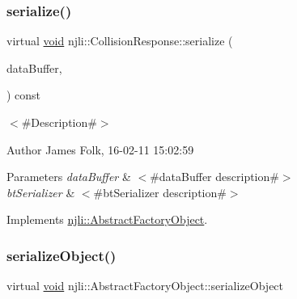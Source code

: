 \mbox{\label{classnjli_1_1_collision_response_ac77762d08227ce57050050a42fa441c3}} 
\subsubsection{\texorpdfstring{serialize()}{serialize()}}
{\footnotesize\ttfamily virtual \mbox{\hyperlink{_thread_8h_af1e856da2e658414cb2456cb6f7ebc66}{void}} njli\+::\+Collision\+Response\+::serialize (\begin{DoxyParamCaption}\item[{\mbox{\hyperlink{_thread_8h_af1e856da2e658414cb2456cb6f7ebc66}{void}} $\ast$}]{data\+Buffer,  }\item[{bt\+Serializer $\ast$}]{ }\end{DoxyParamCaption}) const\hspace{0.3cm}{\ttfamily [virtual]}}



$<$\#\+Description\#$>$ 

\begin{DoxyAuthor}{Author}
James Folk, 16-\/02-\/11 15\+:02\+:59
\end{DoxyAuthor}

\begin{DoxyParams}{Parameters}
{\em data\+Buffer} & $<$\#data\+Buffer description\#$>$ \\
\hline
{\em bt\+Serializer} & $<$\#bt\+Serializer description\#$>$ \\
\hline
\end{DoxyParams}


Implements \mbox{\hyperlink{classnjli_1_1_abstract_factory_object_aad2fbe86fb3bdecf02918a96b9c57976}{njli\+::\+Abstract\+Factory\+Object}}.

\mbox{\label{classnjli_1_1_collision_response_a4fc4bcd9d1930911474210c047372fc0}} 
\subsubsection{\texorpdfstring{serialize\+Object()}{serializeObject()}}
{\footnotesize\ttfamily virtual \mbox{\hyperlink{_thread_8h_af1e856da2e658414cb2456cb6f7ebc66}{void}} njli\+::\+Abstract\+Factory\+Object\+::serialize\+Object}

